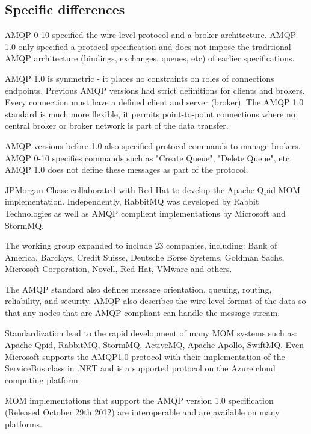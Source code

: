 \documentclass{thesis}
\begin{document}
\subsection {Specific differences}

AMQP 0-10 specified the wire-level protocol and a broker architecture.  AMQP 1.0 only specified a protocol specification and does not impose the traditional AMQP architecture (bindings, exchanges, queues, etc) of earlier specifications.  

AMQP 1.0 is symmetric - it places no constraints on roles of connections endpoints.  Previous AMQP versions had strict definitions for clients and brokers.  Every connection must have a defined client and server (broker).  The AMQP 1.0 standard is much more flexible, it permits point-to-point connections where no central broker or broker network is part of the data transfer.  

AMQP versions before 1.0 also specified protocol commands to manage brokers.  AMQP 0-10 specifies commands such as "Create Queue", "Delete Queue", etc.  AMQP 1.0 does not define these messages as part of the protocol.


 


JPMorgan Chase collaborated with Red Hat to develop the Apache Qpid MOM implementation.  Independently, RabbitMQ was developed by Rabbit Technologies as well as AMQP complient implementations by Microsoft and StormMQ.

The working group expanded to include 23 companies, including: Bank of America, Barclays, Credit Suisse, Deutsche B$\ddot{o}$rse Systems, Goldman Sachs, Microsoft Corporation, Novell, Red Hat, VMware and others.

The AMQP standard also defines message orientation, queuing, routing, reliability, and security.   AMQP also describes the wire-level format of the data so that any nodes that are AMQP compliant can handle the message stream.  

Standardization lead to the rapid development of many MOM systems such as: Apache Qpid, RabbitMQ, StormMQ, ActiveMQ, Apache Apollo, SwiftMQ.  Even Microsoft supports the AMQP1.0 protocol with their implementation of the ServiceBus class in .NET  and is a supported protocol on the Azure cloud computing platform.  

MOM implementations that support the AMQP version 1.0 specification (Released October 29th 2012) \cite{todo} are interoperable and are available on many platforms.  
\end{document}
